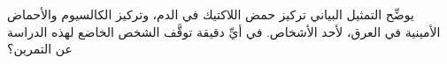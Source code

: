 
\begin{question}

\begin{instance}

\begin{mcq}[standalone=false]

\begin{stem}
يوضِّح التمثيل البياني تركيز حمض اللاكتيك في الدم، وتركيز الكالسيوم والأحماض الأمينية في العرق، لأحد الأشخاص. في أيِّ دقيقة توقَّف الشخص الخاضع لهذه الدراسة عن التمرين؟\par
{}
\end{stem}

\begin{distractors}
        
\end{distractors}

\end{mcq}

\end{instance}

\end{question}
